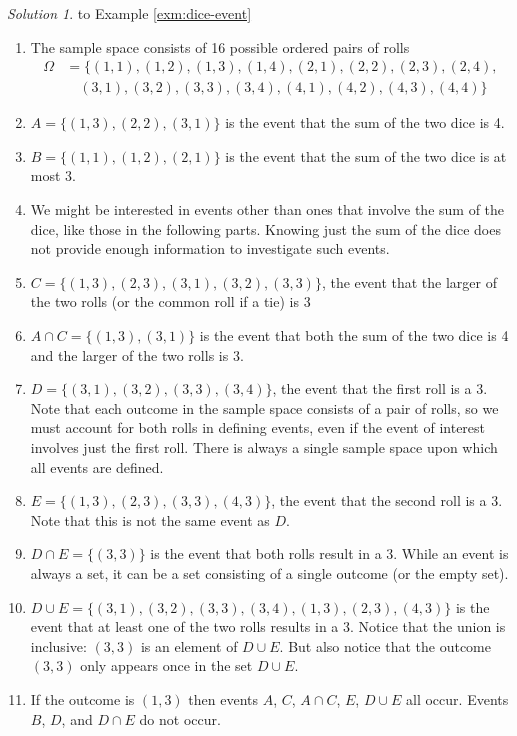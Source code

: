 \documentclass[
]{book}
\providecommand{\tightlist}{%
  \setlength{\itemsep}{0pt}\setlength{\parskip}{0pt}}
\theoremstyle{definition}
\theoremstyle{definition}
\theoremstyle{definition}
\theoremstyle{remark}
\newtheorem*{solution}{Solution}
\begin{document}
\begin{solution}
{}to Example \ref{exm:dice-event}
\end{solution}

\begin{enumerate}
\def\labelenumi{\arabic{enumi}.}
\tightlist
\item
  The sample space consists of 16 possible ordered pairs of rolls
  \begin{align*}
  \Omega & = \{(1, 1), (1, 2), (1, 3), (1, 4), (2, 1), (2, 2), (2, 3), (2, 4),\\
  & \quad (3, 1), (3, 2), (3, 3), (3, 4), (4, 1), (4, 2), (4, 3), (4, 4)\}
  \end{align*}
\item
  \(A=\{(1, 3), (2, 2), (3, 1)\}\) is the event that the sum of the two dice is 4.
\item
  \(B=\{(1, 1), (1, 2), (2, 1)\}\) is the event that the sum of the two dice is at most 3.
\item
  We might be interested in events other than ones that involve the sum of the dice, like those in the following parts. Knowing just the sum of the dice does not provide enough information to investigate such events.
\item
  \(C=\{(1, 3), (2, 3), (3, 1), (3, 2), (3, 3)\}\), the event that the larger of the two rolls (or the common roll if a tie) is 3
\item
  \(A\cap C=\{(1, 3), (3, 1)\}\) is the event that both the sum of the two dice is 4 and the larger of the two rolls is 3.
\item
  \(D=\{(3, 1), (3, 2), (3, 3), (3, 4)\}\), the event that the first roll is a 3. Note that each outcome in the sample space consists of a pair of rolls, so we must account for both rolls in defining events, even if the event of interest involves just the first roll. There is always a single sample space upon which all events are defined.
\item
  \(E=\{(1, 3), (2, 3), (3, 3), (4, 3)\}\), the event that the second roll is a 3. Note that this is not the same event as \(D\).
\item
  \(D \cap E = \{(3, 3)\}\) is the event that both rolls result in a 3. While an event is always a set, it can be a set consisting of a single outcome (or the empty set).
\item
  \(D \cup E = \{(3, 1), (3, 2), (3, 3), (3, 4), (1, 3), (2, 3), (4, 3)\}\) is the event that at least one of the two rolls results in a 3. Notice that the union is inclusive: \((3, 3)\) is an element of \(D\cup E\). But also notice that the outcome \((3, 3)\) only appears once in the set \(D \cup E\).
\item
  If the outcome is \((1, 3)\) then events \(A\), \(C\), \(A\cap C\), \(E\), \(D\cup E\) all occur. Events \(B\), \(D\), and \(D\cap E\) do not occur.
\end{enumerate}
\end{document}
